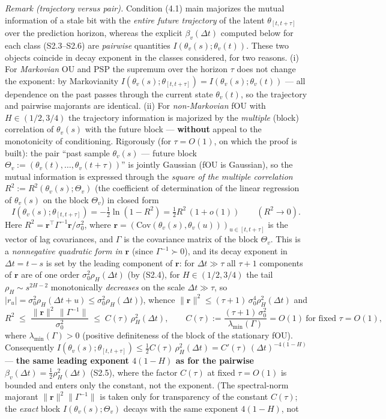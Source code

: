 \documentclass[12pt]{iopart}
\begin{document}
\emph{Remark (trajectory versus pair).} Condition (4.1) main majorizes the mutual information of a stale bit with the \emph{entire future trajectory} of the latent \(\theta_{[t,t+\tau]}\) over the prediction horizon, whereas the explicit \(\beta_v(\Delta t)\) computed below for each class (S2.3--S2.6) are \emph{pairwise} quantities \(I(\theta_v(s);\theta_v(t))\). These two objects coincide in decay exponent in the classes considered, for two reasons. (i) For \emph{Markovian} OU and PSP the supremum over the horizon \(\tau\) does not change the exponent: by Markovianity \(I(\theta_v(s);\theta_{[t,t+\tau]}) = I(\theta_v(s);\theta_v(t))\) --- all dependence on the past passes through the current state \(\theta_v(t)\), so the trajectory and pairwise majorants are identical. (ii) For \emph{non-Markovian} fOU with \(H \in (1/2, 3/4)\) the trajectory information is majorized by the \emph{multiple} (block) correlation of \(\theta_v(s)\) with the future block --- \textbf{without} appeal to the monotonicity of conditioning. Rigorously (for \(\tau = O(1)\), on which the proof is built): the pair ``past sample \(\theta_v(s)\) --- future block \(\Theta_v := (\theta_v(t),\dots,\theta_v(t+\tau))\)'' is jointly Gaussian (fOU is Gaussian), so the mutual information is expressed through the \emph{square of the multiple correlation} \(R^2 := R^2(\theta_v(s);\Theta_v)\) (the coefficient of determination of the linear regression of \(\theta_v(s)\) on the block \(\Theta_v\)) in closed form \[I(\theta_v(s);\theta_{[t,t+\tau]}) = -\tfrac12\ln(1-R^2) = \tfrac12 R^2\,(1+o(1)) \qquad (R^2 \to 0).\] Here \(R^2 = \mathbf r^\top \Gamma^{-1}\mathbf r/\sigma_0^2\), where \(\mathbf r = (\mathrm{Cov}(\theta_v(s),\theta_v(u)))_{u\in[t,t+\tau]}\) is the vector of lag covariances, and \(\Gamma\) is the covariance matrix of the block \(\Theta_v\). This is a \emph{nonnegative quadratic form in \(\mathbf r\)} (since \(\Gamma^{-1}\succ0\)), and its decay exponent in \(\Delta t = t-s\) is set by the leading component of \(\mathbf r\): for \(\Delta t \gg \tau\) all \(\tau+1\) components of \(\mathbf r\) are of one order \(\sigma_0^2\rho_H(\Delta t)\) (by (S2.4), for \(H \in (1/2,3/4)\) the tail \(\rho_H \sim s^{2H-2}\) monotonically \emph{decreases} on the scale \(\Delta t \gg \tau\), so \(|r_u| = \sigma_0^2\rho_H(\Delta t + u) \le \sigma_0^2\rho_H(\Delta t)\)), whence \(\|\mathbf r\|^2 \le (\tau+1)\,\sigma_0^4\rho_H^2(\Delta t)\) and \[R^2 \;\le\; \frac{\|\mathbf r\|^2\,\|\Gamma^{-1}\|}{\sigma_0^2} \;\le\; C(\tau)\,\rho_H^2(\Delta t), \qquad C(\tau) := \frac{(\tau+1)\,\sigma_0^2}{\lambda_{\min}(\Gamma)} = O(1)\ \text{for fixed } \tau=O(1),\] where \(\lambda_{\min}(\Gamma) > 0\) (positive definiteness of the block of the stationary fOU). Consequently \(I(\theta_v(s);\theta_{[t,t+\tau]}) \le \tfrac12 C(\tau)\,\rho_H^2(\Delta t) = C'(\tau)\,(\Delta t)^{-4(1-H)}\) --- \textbf{the same leading exponent \(4(1-H)\) as for the pairwise \(\beta_v(\Delta t) = \tfrac12\rho_H^2(\Delta t)\)} (S2.5), where the factor \(C(\tau)\) at fixed \(\tau = O(1)\) is bounded and enters only the constant, not the exponent. (The spectral-norm majorant \(\|\mathbf r\|^2\|\Gamma^{-1}\|\) is taken only for transparency of the constant \(C(\tau)\); the \emph{exact} block \(I(\theta_v(s);\Theta_v)\) decays with the same exponent \(4(1-H)\), not 
\end{document}
